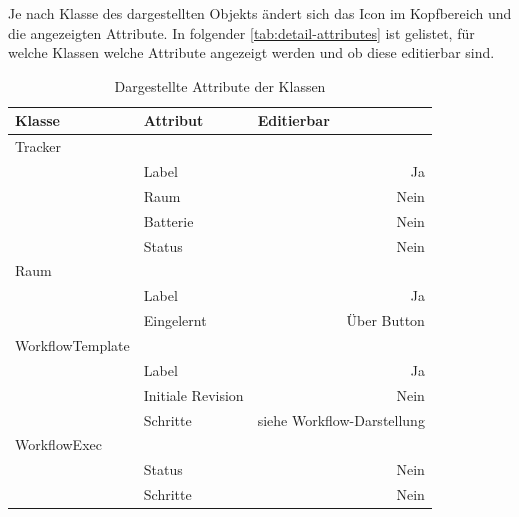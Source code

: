 Je nach Klasse des dargestellten Objekts ändert sich das Icon im Kopfbereich und die angezeigten Attribute.
In folgender \autoref{tab:detail-attributes} ist gelistet, für welche Klassen welche Attribute angezeigt werden und ob diese editierbar sind.

\begin{table}[]
\centering
\begin{tabular}{l|l|r}
\textbf{Klasse}  & \textbf{Attribut} & \multicolumn{1}{l}{\textbf{Editierbar}} \\ \hline
Tracker          &                   &                                         \\
								 & Label             & Ja                                      \\
								 & Raum              & Nein                                    \\
								 & Batterie          & Nein                                    \\
								 & Status            & Nein                                    \\ \hline
Raum             &                   & \multicolumn{1}{l}{}                    \\
								 & Label             & Ja                                      \\
								 & Eingelernt        & Über Button                             \\ \hline
WorkflowTemplate &                   & \multicolumn{1}{l}{}                    \\
								 & Label             & Ja                                      \\
								 & Initiale Revision & Nein                                    \\
								 & Schritte          & siehe Workflow-Darstellung              \\ \hline
WorkflowExec     &                   & \multicolumn{1}{l}{}                    \\
								 & Status            & Nein                                    \\
								 & Schritte          & Nein
\end{tabular}
\caption{Dargestellte Attribute der Klassen}
\label{tab:detail-attributes}
\end{table}

